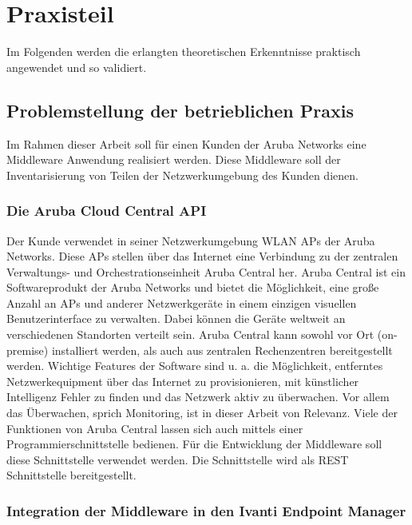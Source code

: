\chapter{Praxisteil}\label{chapter:praxisteil}

Im Folgenden werden die erlangten theoretischen Erkenntnisse praktisch angewendet und so validiert.

\section{Problemstellung der betrieblichen Praxis}\label{section:problemstellung-der-betrieblichen-praxis}

Im Rahmen dieser Arbeit soll für einen Kunden der Aruba Networks eine Middleware Anwendung realisiert werden. Diese Middleware soll der Inventarisierung von Teilen der Netzwerkumgebung des Kunden dienen. 

\subsection{Die Aruba Cloud Central API}\label{subsection:die-aruba-cloud-central-api}

Der Kunde verwendet in seiner Netzwerkumgebung WLAN APs der Aruba Networks. Diese APs stellen über das Internet eine Verbindung zu der zentralen Verwaltungs- und Orchestrationseinheit Aruba Central her. Aruba Central ist ein Softwareprodukt der Aruba Networks und bietet die Möglichkeit, eine große Anzahl an APs und anderer Netzwerkgeräte in einem einzigen visuellen Benutzerinterface zu verwalten. Dabei können die Geräte weltweit an verschiedenen Standorten verteilt sein. Aruba Central kann sowohl vor Ort (on-premise) installiert werden, als auch aus zentralen Rechenzentren bereitgestellt werden. Wichtige Features der Software sind u. a. die Möglichkeit, entferntes Netzwerkequipment über das Internet  zu provisionieren, mit künstlicher Intelligenz Fehler zu finden und das Netzwerk aktiv zu überwachen. Vor allem das Überwachen, sprich Monitoring, ist in dieser Arbeit von Relevanz. Viele der Funktionen von Aruba Central lassen sich auch mittels einer Programmierschnittstelle bedienen. Für die Entwicklung der Middleware soll diese Schnittstelle verwendet werden. Die Schnittstelle wird als REST Schnittstelle bereitgestellt.

\subsection{Integration der Middleware in den Ivanti Endpoint Manager}\label{chapter:einleitung}

